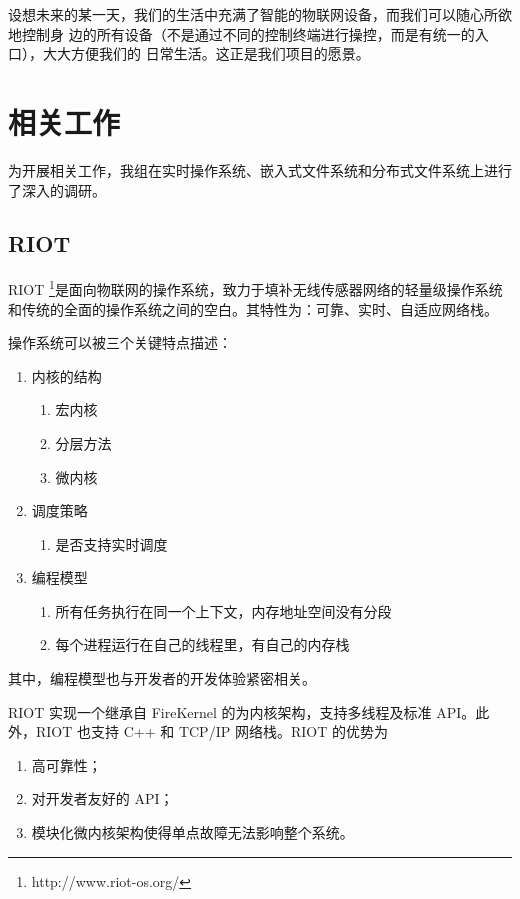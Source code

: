 \documentclass{ctexart}
\begin{document}
设想未来的某一天，我们的生活中充满了智能的物联网设备，而我们可以随心所欲地控制身
边的所有设备（不是通过不同的控制终端进行操控，而是有统一的入口），大大方便我们的
日常生活。这正是我们项目的愿景。


\section{相关工作}

为开展相关工作，我组在实时操作系统、嵌入式文件系统和分布式文件系统上进行了深入的调研。

\subsection{RIOT}

RIOT \footnote{http://www.riot-os.org/}是面向物联网的操作系统，致力于填补无线传感器网络的轻量级操作系统和传统的全面的操作系统之间的空白。其特性为：可靠、实时、自适应网络栈。

操作系统可以被三个关键特点描述：

\begin{enumerate}
	\item 内核的结构
	\begin{enumerate}
		\item 宏内核
		\item 分层方法
		\item 微内核
	\end{enumerate}
	\item 调度策略
	\begin{enumerate}
		\item 是否支持实时调度
	\end{enumerate}
	\item 编程模型
	\begin{enumerate}
		\item 所有任务执行在同一个上下文，内存地址空间没有分段
		\item 每个进程运行在自己的线程里，有自己的内存栈
	\end{enumerate}
\end{enumerate}

其中，编程模型也与开发者的开发体验紧密相关。

RIOT 实现一个继承自 FireKernel 的为内核架构，支持多线程及标准 API。此外，RIOT 也支持 C++ 和 TCP/IP 网络栈。RIOT 的优势为

\begin{enumerate}
	\item 高可靠性；
	\item 对开发者友好的 API；
	\item 模块化微内核架构使得单点故障无法影响整个系统。
\end{enumerate}
\end{document}
